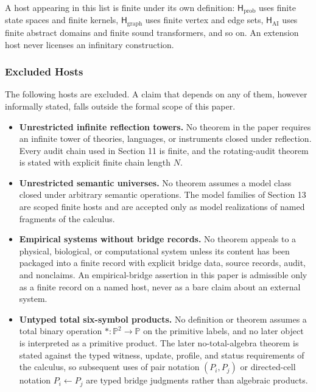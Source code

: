 \documentclass[11pt]{article}
\providecommand{\tightlist}{}
\theoremstyle{definition}
\begin{document}
A host appearing in this list is finite under its own definition: \(\mathsf H_{\mathrm{prob}}\) uses finite state spaces and finite kernels, \(\mathsf H_{\mathrm{graph}}\) uses finite vertex and edge sets, \(\mathsf H_{\mathrm{AI}}\) uses finite abstract domains and finite sound transformers, and so on. An extension host never licenses an infinitary construction.

\subsubsection{Excluded Hosts}

The following hosts are excluded. A claim that depends on any of them, however informally stated, falls outside the formal scope of this paper.

\begin{itemize}
\tightlist
\item
  \textbf{Unrestricted infinite reflection towers.} No theorem in the paper requires an infinite tower of theories, languages, or instruments closed under reflection. Every audit chain used in Section 11 is finite, and the rotating-audit theorem is stated with explicit finite chain length \(N\).
\item
  \textbf{Unrestricted semantic universes.} No theorem assumes a model class closed under arbitrary semantic operations. The model families of Section 13 are scoped finite hosts and are accepted only as model realizations of named fragments of the calculus.
\item
  \textbf{Empirical systems without bridge records.} No theorem appeals to a physical, biological, or computational system unless its content has been packaged into a finite record with explicit bridge data, source records, audit, and nonclaims. An empirical-bridge assertion in this paper is admissible only as a finite record on a named host, never as a bare claim about an external system.
\item
  \textbf{Untyped total six-symbol products.} No definition or theorem assumes a total binary operation \(*:\mathbb P^2\to\mathbb P\) on the primitive labels, and no later object is interpreted as a primitive product. The later no-total-algebra theorem is stated against the typed witness, update, profile, and status requirements of the calculus, so subsequent uses of pair notation \((P_i,P_j)\) or directed-cell notation \(P_i\leftarrow P_j\) are typed bridge judgments rather than algebraic products.
\end{itemize}
\end{document}
